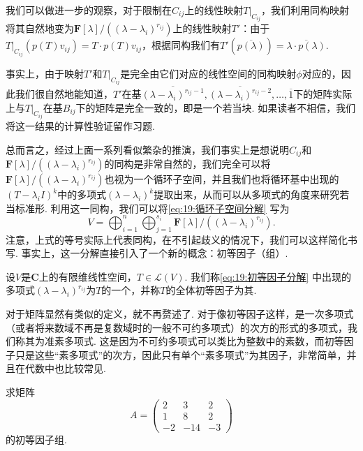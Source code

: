我们可以做进一步的观察，对于限制在$C_{ij}$上的线性映射$T|_{C_{ij}}$，我们利用同构映射将其自然地变为$\mathbf{F}[\lambda]/((\lambda-\lambda_i)^{r_{ij}})$上的线性映射$T'$：由于$T|_{C_{ij}}(p(T)v_{ij})=T\cdot p(T)v_{ij}$，根据同构我们有$T'(\overline{p(\lambda)})=\overline{\lambda\cdot p(\lambda)}$.

事实上，由于映射$T'$和$T|_{C_{ij}}$是完全由它们对应的线性空间的同构映射$\phi$对应的，因此我们很自然地能知道，$T'$在基$\overline{(\lambda-\lambda_i)^{r_{ij}-1}},\overline{(\lambda-\lambda_i)^{r_{ij}-2}},\ldots,\overline{1}$下的矩阵实际上与$T|_{C_{ij}}$在基$B_{ij}$下的矩阵是完全一致的，即是一个若当块. 如果读者不相信，我们将这一结果的计算性验证留作习题.

总而言之，经过上面一系列看似繁杂的推演，我们事实上是想说明$C_{ij}$和$\mathbf{F}[\lambda]/((\lambda-\lambda_i)^{r_{ij}})$的同构是非常自然的，我们完全可以将$\mathbf{F}[\lambda]/((\lambda-\lambda_i)^{r_{ij}})$也视为一个循环子空间，并且我们也将循环基中出现的$(T-\lambda_i I)^k$中的多项式$(\lambda-\lambda_i)^k$提取出来，从而可以从多项式的角度来研究若当标准形. 利用这一同构，我们可以将\autoref{eq:19:循环子空间分解} 写为
\begin{equation} \label{eq:19:初等因子分解}
    V=\bigoplus_{i=1}^n\bigoplus_{j=1}^{s_i} \mathbf{F}[\lambda]/((\lambda-\lambda_i)^{r_{ij}}).
\end{equation}
注意，上式的等号实际上代表同构，在不引起歧义的情况下，我们可以这样简化书写. 事实上，这一分解直接引入了一个新的概念：初等因子（组）.
\begin{definition}{}{}
    设$V$是$\mathbf{C}$上的有限维线性空间，$T\in\mathcal{L}(V)$. 我们称\autoref{eq:19:初等因子分解} 中出现的多项式$(\lambda-\lambda_i)^{r_{ij}}$为$T$的一个，并称$T$的全体初等因子为其.
\end{definition}

对于矩阵显然有类似的定义，就不再赘述了. 对于像初等因子这样，是一次多项式（或者将来数域不再是复数域时的一般不可约多项式）的次方的形式的多项式，我们称其为准素多项式. 这是因为不可约多项式可以类比为整数中的素数，而初等因子只是这些``素多项式''的次方，因此只有单个``素多项式''为其因子，非常简单，并且在代数中也比较常见.

\begin{example}{}{}
    求矩阵
    \[
        A=\begin{pmatrix}
                2 & 3 & 2 \\
                1 & 8 & 2 \\
                -2 & -14 & -3
            \end{pmatrix}
    \]
    的初等因子组.
\end{example}

